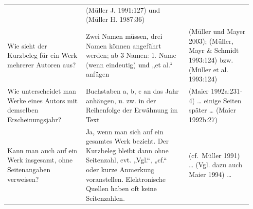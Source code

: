 \documentclass[]{book}
\theoremstyle{definition}
\theoremstyle{definition}
\theoremstyle{definition}
\theoremstyle{remark}
\begin{document}
\begin{longtable}[]{@{}lll@{}}
\begin{minipage}[t]{0.33\columnwidth}
\end{minipage} & \begin{minipage}[t]{0.32\columnwidth}\raggedright\strut
(Müller J. 1991:127) und (Müller H. 1987:36) \vspace{-6mm}\strut
\end{minipage}\tabularnewline
\begin{minipage}[t]{0.26\columnwidth}\raggedright\strut
Wie sieht der Kurzbeleg für ein Werk mehrerer Autoren aus?\strut
\end{minipage} & \begin{minipage}[t]{0.33\columnwidth}\raggedright\strut
Zwei Namen müssen, drei Namen können angeführt werden; ab 3 Namen: 1.
Name (wenn eindeutig) und „et al.`` anfügen\strut
\end{minipage} & \begin{minipage}[t]{0.32\columnwidth}\raggedright\strut
(Müller und Mayer 2003); (Müller, Mayr \& Schmidt 1993:124) bzw. (Müller
et al. 1993:124) \vspace{-6mm}\strut
\end{minipage}\tabularnewline
\begin{minipage}[t]{0.26\columnwidth}\raggedright\strut
Wie unterscheidet man Werke eines Autors mit demselben
Erscheinungsjahr?\strut
\end{minipage} & \begin{minipage}[t]{0.33\columnwidth}\raggedright\strut
Buchstaben a, b, c an das Jahr anhängen, u. zw. in der Reihenfolge der
Erwähnung im Text\strut
\end{minipage} & \begin{minipage}[t]{0.32\columnwidth}\raggedright\strut
(Maier 1992a:231-4) \ldots{} einige Seiten später \ldots{} (Maier
1992b:27) \vspace{-6mm}\strut
\end{minipage}\tabularnewline
\begin{minipage}[t]{0.26\columnwidth}\raggedright\strut
Kann man auch auf ein Werk insgesamt, ohne Seitenangaben
verweisen?\strut
\end{minipage} & \begin{minipage}[t]{0.33\columnwidth}\raggedright\strut
Ja, wenn man sich auf ein gesamtes Werk bezieht. Der Kurzbeleg bleibt
dann ohne Seitenzahl, evt. „Vgl.``, „cf.`` oder kurze Anmerkung
voranstellen. Elektronische Quellen haben oft keine Seitenzahlen.\strut
\end{minipage} & \begin{minipage}[t]{0.32\columnwidth}\raggedright\strut
(cf.~Müller 1991) \ldots{} (Vgl. dazu auch Maier 1994) \ldots{}

\end{minipage}
\end{longtable}
\end{document}
